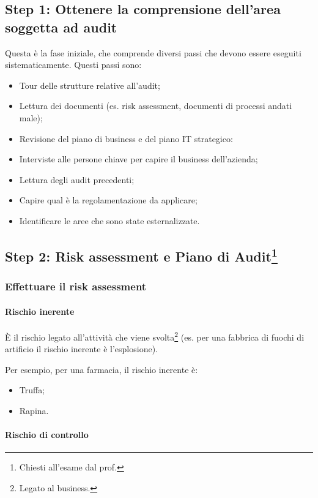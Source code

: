 \subsection{Step 1: Ottenere la comprensione dell'area soggetta ad audit}

Questa è la fase iniziale, che comprende diversi passi che devono essere
eseguiti sistematicamente.
Questi passi sono:
\begin{itemize}
\item Tour delle strutture relative all'audit;
\item Lettura dei documenti (es. risk assessment, documenti di processi andati
male);
\item Revisione del piano di business e del piano IT strategico:
\item Interviste alle persone chiave per capire il business dell'azienda;
\item Lettura degli audit precedenti;
\item Capire qual è la regolamentazione da applicare;
\item Identificare le aree che sono state esternalizzate.
\end{itemize}

\subsection[Step 2: Risk assessment e Piano di Audit]{Step 2: Risk 
assessment e Piano di Audit\protect\footnote{Chiesti all'esame dal 
prof.}}

\subsubsection{Effettuare il risk assessment}

\paragraph*{Rischio inerente}

È il rischio legato all'attività che viene svolta\footnote{Legato al business.}
(es. per una fabbrica di fuochi di artificio il rischio inerente è
l'esplosione).

Per esempio, per una farmacia, il rischio inerente è:
\begin{itemize}
\item Truffa;
\item Rapina.
\end{itemize}

\paragraph*{Rischio di controllo}

